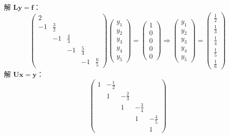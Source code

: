 \documentclass{sjtuarticle}
\begin{document}
\begin{itemize}
\begin{solution}
\begin{equation*}
        \end{equation*}
        解 $\bm{L}\bm{y}=\bm{f}$：
        \begin{equation*}
            \begin{pmatrix}
                2 \\
                -1 & \frac{3}{2} \\
                   & -1 & \frac{4}{3} \\
                   &    &    -1 & \frac{5}{4} \\
                   &    &             & -1 & \frac{6}{5}
            \end{pmatrix}\begin{pmatrix}
                y_1 \\ y_2 \\ y_3 \\ y_4 \\ y_5
            \end{pmatrix}=\begin{pmatrix}
                1 \\ 0 \\ 0 \\ 0 \\ 0
            \end{pmatrix}\Rightarrow\begin{pmatrix}
                y_1 \\ y_2 \\ y_3 \\ y_4 \\ y_5
            \end{pmatrix}=\begin{pmatrix}
                \frac{1}{2} \\ \frac{1}{3} \\ \frac{1}{4} \\ \frac{1}{5} \\ \frac{1}{6}
            \end{pmatrix}
        \end{equation*}
        解 $\bm{U}\bm{x}=\bm{y}$：
        \begin{equation*}
            \begin{pmatrix}
                1 & -\frac{1}{2} \\
                  &  1 & -\frac{2}{3} \\
                  &    &  1  & -\frac{3}{4} \\
                  &    &     &   1   & -\frac{4}{5} \\
                  &    &     &       &    1

\end{pmatrix}
\end{equation*}
\end{solution}
\end{itemize}
\end{document}
